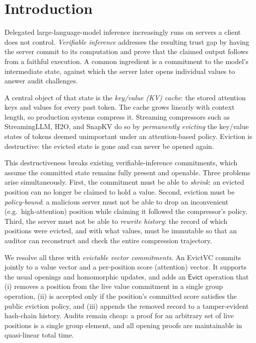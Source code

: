 \documentclass[version=submission]{iacrcc}
\theoremstyle{definition}
\newcommand{\Evict}{\mathsf{Evict}}
\begin{document}
\section{Introduction}\label{sec:intro}

Delegated large-language-model inference increasingly runs on servers a client
does not control. \emph{Verifiable inference} addresses the resulting trust gap
by having the server commit to its computation and prove that the claimed output
follows from a faithful execution. A common ingredient is a commitment to the
model's intermediate state, against which the server later opens individual
values to answer audit challenges.

A central object of that state is the \emph{key/value (KV) cache}: the stored
attention keys and values for every past token. The cache grows linearly with
context length, so production systems compress it. Streaming compressors such as
StreamingLLM, H2O, and SnapKV do so by \emph{permanently evicting} the
key/value states of tokens deemed unimportant under an attention-based policy.
Eviction is destructive: the evicted state is gone and can never be opened
again.

This destructiveness breaks existing verifiable-inference commitments, which
assume the committed state remains fully present and openable. Three problems
arise simultaneously. First, the commitment must be able to \emph{shrink}: an
evicted position can no longer be claimed to hold a value. Second, eviction must
be \emph{policy-bound}: a malicious server must not be able to drop an
inconvenient (e.g.\ high-attention) position while claiming it followed the
compressor's policy. Third, the server must not be able to \emph{rewrite history}:
the record of which positions were evicted, and with what values, must be
immutable so that an auditor can reconstruct and check the entire compression
trajectory.

We resolve all three with \emph{evictable vector commitments}. An EvictVC commits
jointly to a value vector and a per-position score (attention) vector. It
supports the usual openings and homomorphic updates, and adds an $\Evict$
operation that (i) removes a position from the live value commitment in a single
group operation, (ii) is accepted only if the position's committed score
satisfies the public eviction policy, and (iii) appends the removed record to a
tamper-evident hash-chain history. Audits remain cheap: a proof for an arbitrary
set of live positions is a single group element, and all opening proofs are
maintainable in quasi-linear total time.
\end{document}
